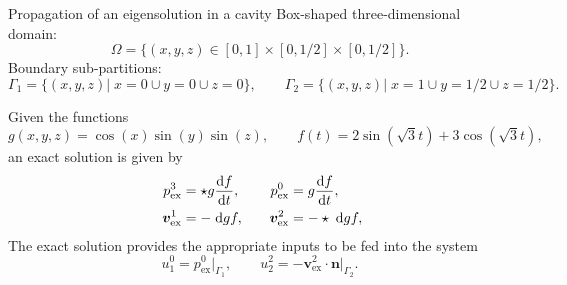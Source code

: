 \documentclass[aspectratio=169]{beamer}
\begin{document}
\begin{frame}{Propagation of an eigensolution in a cavity}
	Box-shaped three-dimensional domain:
	$$\Omega = \{ (x,y,z) \in [0, 1]\times[0, 1/2]\times[0, 1/2] \}.$$ 
	Boundary sub-partitions:
	\begin{equation*}
		\Gamma_1 = \{(x,y,z) \vert \; x=0 \cup y=0 \cup z=0\}, \qquad \Gamma_2 = \{(x, y, z) \vert \; x=1 \cup y=1/2 \cup z=1/2 \}.
	\end{equation*}

Given the functions
\begin{equation*}
	g(x, y, z) = \cos(x) \sin(y) \sin(z), \qquad f(t) = 2 \sin(\sqrt{3} t) + 3 \cos(\sqrt{3} t),
\end{equation*}
an exact solution  is given by
\begin{equation*}\	\begin{aligned}
		p^3_{\mathrm{ex}} &= \star g \diff{f}{t}, \\    
		\bm{v}^1_{\mathrm{ex}} &= -\d{g} f, 
	\end{aligned} \qquad 
	\begin{aligned}
		p^0_{\mathrm{ex}} &= g \diff{f}{t}, \\
		\bm{v}^2_{\mathrm{ex}} &= -\star \d{g} f,
	\end{aligned}
\end{equation*}
The exact solution provides the appropriate inputs to be fed into the system
\begin{equation*}
	u^0_1 =p^0_{\mathrm{ex}}|_{\Gamma_1}, \qquad u^2_2 =  -\bm{v}^2_{\mathrm{ex}} \cdot \bm{n}\vert_{\Gamma_2}.
	\end{equation*}
\end{frame}
\end{document}

